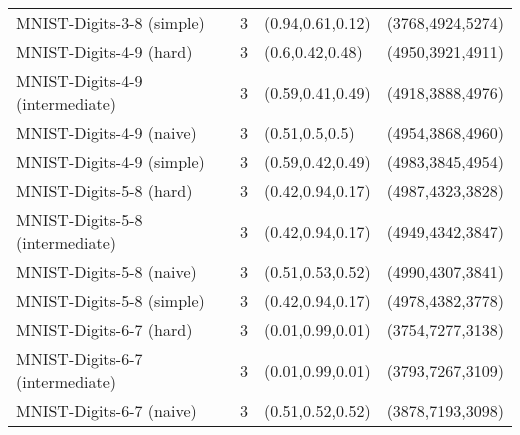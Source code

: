 \begin{tabular}{llll}
                       MNIST-Digits-3-8 (simple) &              3 &                                    (0.94,0.61,0.12) &                                               (3768,4924,5274) \\
                         MNIST-Digits-4-9 (hard) &              3 &                                     (0.6,0.42,0.48) &                                               (4950,3921,4911) \\
                 MNIST-Digits-4-9 (intermediate) &              3 &                                    (0.59,0.41,0.49) &                                               (4918,3888,4976) \\
                        MNIST-Digits-4-9 (naive) &              3 &                                      (0.51,0.5,0.5) &                                               (4954,3868,4960) \\
                       MNIST-Digits-4-9 (simple) &              3 &                                    (0.59,0.42,0.49) &                                               (4983,3845,4954) \\
                         MNIST-Digits-5-8 (hard) &              3 &                                    (0.42,0.94,0.17) &                                               (4987,4323,3828) \\
                 MNIST-Digits-5-8 (intermediate) &              3 &                                    (0.42,0.94,0.17) &                                               (4949,4342,3847) \\
                        MNIST-Digits-5-8 (naive) &              3 &                                    (0.51,0.53,0.52) &                                               (4990,4307,3841) \\
                       MNIST-Digits-5-8 (simple) &              3 &                                    (0.42,0.94,0.17) &                                               (4978,4382,3778) \\
                         MNIST-Digits-6-7 (hard) &              3 &                                    (0.01,0.99,0.01) &                                               (3754,7277,3138) \\
                 MNIST-Digits-6-7 (intermediate) &              3 &                                    (0.01,0.99,0.01) &                                               (3793,7267,3109) \\
                        MNIST-Digits-6-7 (naive) &              3 &                                    (0.51,0.52,0.52) &                                               (3878,7193,3098) \\

\end{tabular}
